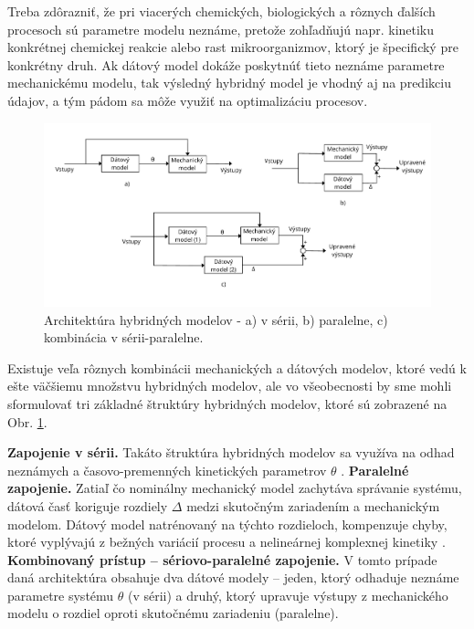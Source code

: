 Treba zdôrazniť, že pri viacerých chemických, biologických a rôznych ďalších procesoch sú parametre modelu neznáme, pretože zohľadňujú napr. kinetiku konkrétnej chemickej reakcie alebo rast mikroorganizmov, ktorý je špecifický pre konkrétny druh. Ak dátový model dokáže poskytnúť tieto neznáme parametre mechanickému modelu, tak výsledný hybridný model je vhodný aj na predikciu údajov, a tým pádom sa môže využiť na optimalizáciu procesov.

\begin{figure}
	\centering
	\includegraphics[width=\linewidth]{images/hybrid_model}
	\caption{Architektúra hybridných modelov - a) v sérii, b) paralelne, c) kombinácia v sérii-paralelne.}
	\label{fig:hybrid_model_general}
\end{figure} 

Existuje veľa rôznych kombinácii mechanických a dátových modelov, ktoré vedú k ešte väčšiemu množstvu hybridných modelov, ale vo všeobecnosti by sme mohli sformulovať tri základné štruktúry hybridných modelov, ktoré sú zobrazené na Obr. \ref{fig:hybrid_model_general}.

\textbf{Zapojenie v sérii.} Takáto štruktúra hybridných modelov sa využíva na odhad neznámych  a časovo-premenných kinetických parametrov $ \theta $ \cite{bhutani:hybrid_modelling_opt:2006}.\newline
\textbf{Paralelné zapojenie.} Zatiaľ čo nominálny mechanický model zachytáva správanie systému, dátová časť koriguje rozdiely $ \Delta $ medzi skutočným zariadením a mechanickým modelom. Dátový model natrénovaný na týchto rozdieloch, kompenzuje chyby, ktoré vyplývajú z bežných variácií procesu a nelineárnej komplexnej kinetiky \cite{bhutani:hybrid_modelling_opt:2006}.\newline
\textbf{Kombinovaný prístup -- sériovo-paralelné zapojenie.} V tomto prípade daná architektúra obsahuje dva dátové modely -- jeden, ktorý odhaduje neznáme parametre systému $ \theta $ (v sérii) a druhý, ktorý upravuje výstupy z mechanického modelu o rozdiel oproti skutočnému zariadeniu (paralelne). 